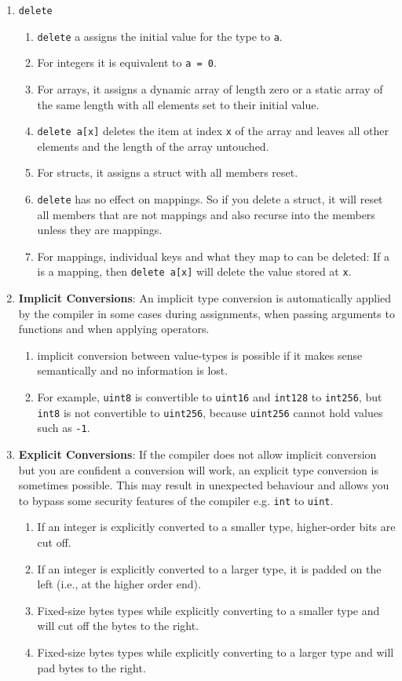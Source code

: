 \begin{enumerate}
\item\verb|delete|
    \begin{enumerate}
    \item\verb|delete| a assigns the initial value for the type to \verb|a|.
    \item For integers it is equivalent to \verb|a = 0|.
    \item For arrays, it assigns a dynamic array of length zero or a static array of the same length with all elements set to their initial value.
    \item\verb|delete a[x]| deletes the item at index \verb|x| of the array and leaves all other elements and the length of the array untouched.
    \item For structs, it assigns a struct with all members reset.
    \item\verb|delete| has no effect on mappings. So if you delete a struct, it will reset all members that are not mappings and also recurse into the members unless they are mappings.
    \item For mappings, individual keys and what they map to can be deleted: If a is a mapping, then \verb|delete a[x]| will delete the value stored at \verb|x|.
    \end{enumerate}

\item\textbf{Implicit Conversions}: An implicit type conversion is automatically applied by the compiler in some cases during assignments, when passing arguments to functions and when applying operators.
    \begin{enumerate}
    \item implicit conversion between value-types is possible if it makes sense semantically and no information is lost.
    \item For example, \verb|uint8| is convertible to \verb|uint16| and \verb|int128| to \verb|int256|, but \verb|int8| is not convertible to \verb|uint256|, because \verb|uint256| cannot hold values such as \verb|-1|.
    \end{enumerate}

\item\textbf{Explicit Conversions}: If the compiler does not allow implicit conversion but you are confident a conversion will work, an explicit type conversion is sometimes possible. This may result in unexpected behaviour and allows you to bypass some security features of the compiler e.g. \verb|int| to \verb|uint|.
    \begin{enumerate}
    \item If an integer is explicitly converted to a smaller type, higher-order bits are cut off.
    \item If an integer is explicitly converted to a larger type, it is padded on the left (i.e., at the higher order end).
    \item Fixed-size bytes types while explicitly converting to a smaller type and will cut off the bytes to the right.
    \item Fixed-size bytes types while explicitly converting to a larger type and will pad bytes to the right.
    \end{enumerate}


\end{enumerate}

